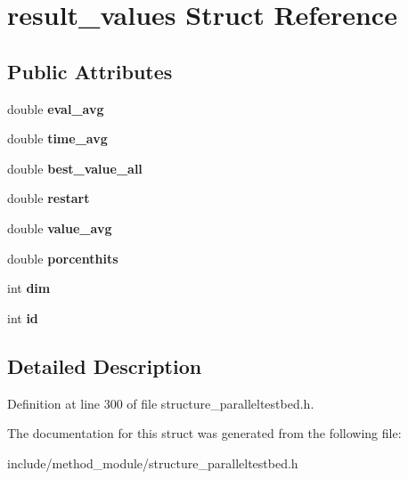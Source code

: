 \hypertarget{structresult__values}{\section{result\-\_\-values Struct Reference}
\label{structresult__values}
}
\subsection*{Public Attributes}
\begin{DoxyCompactItemize}
\item 
\hypertarget{structresult__values_af6b8cf110c42cb0b80b965eb6478dc42}{double {\bfseries eval\-\_\-avg}}\label{structresult__values_af6b8cf110c42cb0b80b965eb6478dc42}

\item 
\hypertarget{structresult__values_ace6d4751eb7436522a73c8119cff8369}{double {\bfseries time\-\_\-avg}}\label{structresult__values_ace6d4751eb7436522a73c8119cff8369}

\item 
\hypertarget{structresult__values_a584c160bf7b8a8cc8dcb26e559a76854}{double {\bfseries best\-\_\-value\-\_\-all}}\label{structresult__values_a584c160bf7b8a8cc8dcb26e559a76854}

\item 
\hypertarget{structresult__values_a5d6f840224705ba8c7abe9bb6085df2c}{double {\bfseries restart}}\label{structresult__values_a5d6f840224705ba8c7abe9bb6085df2c}

\item 
\hypertarget{structresult__values_adccf94cdfaf7802c3c4cf87132bbcbdd}{double {\bfseries value\-\_\-avg}}\label{structresult__values_adccf94cdfaf7802c3c4cf87132bbcbdd}

\item 
\hypertarget{structresult__values_a88860c373be367b8a584d84489297adb}{double {\bfseries porcenthits}}\label{structresult__values_a88860c373be367b8a584d84489297adb}

\item 
\hypertarget{structresult__values_a17e65df8571830f9844376a7bf54bb94}{int {\bfseries dim}}\label{structresult__values_a17e65df8571830f9844376a7bf54bb94}

\item 
\hypertarget{structresult__values_a486ddde91c22f920a760556803b339be}{int {\bfseries id}}\label{structresult__values_a486ddde91c22f920a760556803b339be}

\end{DoxyCompactItemize}


\subsection{Detailed Description}


Definition at line 300 of file structure\-\_\-paralleltestbed.\-h.



The documentation for this struct was generated from the following file\-:\begin{DoxyCompactItemize}
\item 
include/method\-\_\-module/structure\-\_\-paralleltestbed.\-h\end{DoxyCompactItemize}
